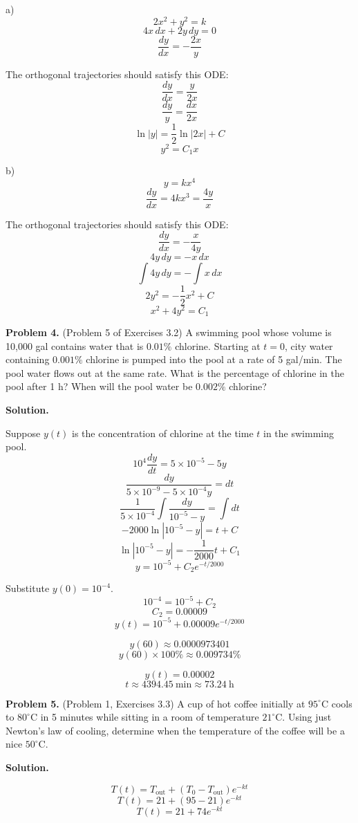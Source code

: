 \documentclass[11pt,a4paper]{article}
\begin{document}
\medskip
\noindent a)
\[
2x^2+y^2=k
\]
\[
4x\,dx+2y\,dy=0
\]
\[
\frac{dy}{dx}=-\frac{2x}{y}
\]

The orthogonal trajectories should satisfy this ODE:
\[
\frac{dy}{dx}=\frac{y}{2x}
\]
\[
\frac{dy}{y}=\frac{dx}{2x}
\]
\[
\ln|y|=\frac12\ln|2x|+C
\]
\[
y^2=C_1x
\]

\medskip
\noindent b)
\[
y=kx^4
\]
\[
\frac{dy}{dx}=4kx^3=\frac{4y}{x}
\]

The orthogonal trajectories should satisfy this ODE:
\[
\frac{dy}{dx}=-\frac{x}{4y}
\]
\[
4y\,dy=-x\,dx
\]
\[
\int4y\,dy=-\int x\,dx
\]
\[
2y^2=-\frac12x^2+C
\]
\[
x^2+4y^2=C_1
\]

\bigskip
\bigskip
\noindent
{\bf Problem 4.} (Problem 5 of Exercises 3.2) A swimming pool whose volume is 10,000 gal contains water
that is $0.01\%$ chlorine. Starting at $t=0$, city water containing
$0.001\%$ chlorine is pumped into the pool at a rate of 5 gal/min. The pool water flows out at the same rate.
What is the percentage of chlorine in the pool after 1 h? When will the pool water be $0.002\%$ chlorine?
\par\medskip
\noindent\textbf{Solution.}\par
\medskip

Suppose \(y(t)\) is the concentration of chlorine at the time \(t\)
in the swimming pool.
\[
10^4\frac{dy}{dt}=5\times10^{-5}-5y
\]
\[
\frac{dy}{5\times10^{-9}-5\times10^{-4}y}=dt
\]
\[
\frac1{5\times10^{-4}}
\int\frac{dy}{10^{-5}-y}
=\int dt
\]
\[
-2000\ln|10^{-5}-y|=t+C
\]
\[
\ln|10^{-5}-y|=-\frac1{2000}t+C_1
\]
\[
y=10^{-5}+C_2e^{-t/2000}
\]

Substitute \(y(0)=10^{-4}\).
\[
10^{-4}=10^{-5}+C_2
\]
\[
C_2=0.00009
\]
\[
y(t)=10^{-5}+0.00009e^{-t/2000}
\]

\[
y(60)\approx0.0000973401
\]
\[
y(60)\times100\%\approx0.009734\%
\]

\[
y(t)=0.00002
\]
\[
t\approx4394.45\ \mathrm{min}\approx73.24\ \mathrm{h}
\]

\bigskip


\bigskip
\noindent
{\bf Problem 5.} (Problem 1, Exercises 3.3) A cup of hot coffee initially at $95^{\circ}$C cools to $80^{\circ}$C in 5 minutes while
sitting in a room of temperature $21^{\circ}$C. Using just Newton's law of cooling, determine when the temperature of the coffee will be
a nice $50^{\circ}$C.
\par\medskip
\noindent\textbf{Solution.}\par
\medskip

\[
T(t)=T_{\mathrm{out}}+(T_0-T_{\mathrm{out}})e^{-kt}
\]
\[
T(t)=21+(95-21)e^{-kt}
\]
\[
T(t)=21+74e^{-kt}
\]
\end{document}

